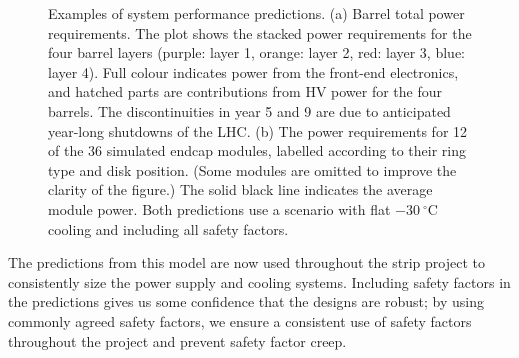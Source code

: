 \begin{figure}[t!]
\centering
{}\quad\quad
{}
\caption{Examples of system performance predictions. (a) Barrel total power requirements. The plot shows the stacked power requirements for the four barrel layers (purple: layer 1, orange: layer 2, red: layer 3, blue: layer 4). Full colour indicates power from the front-end electronics, and hatched parts are contributions from HV power for the four barrels. The discontinuities in year 5 and 9 are due to anticipated year-long shutdowns of the LHC. (b) The power requirements for 12 of the 36 simulated endcap modules, labelled according to their ring type and disk position. (Some modules are omitted to improve the clarity of the figure.) The solid black line indicates the average module power. Both predictions use a scenario with flat $-30~^\circ$C cooling and including all safety factors.}
\label{fig:systemperformance}
\end{figure}

The predictions from this model are now used throughout the strip project to consistently size the power supply and cooling systems. Including safety factors in the predictions gives us some confidence that the designs are robust; by using commonly agreed safety factors, we ensure a consistent use of safety factors throughout the project and prevent safety factor creep.


